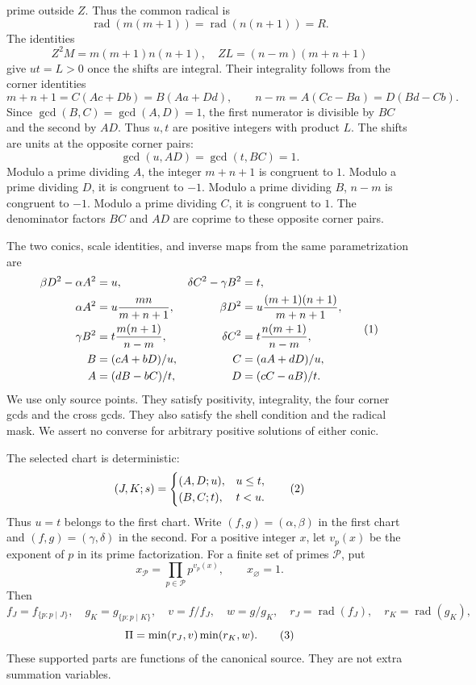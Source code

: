 prime outside \(Z\).
Thus the common radical is
\[
\operatorname{rad}(m(m+1))=\operatorname{rad}(n(n+1))=R.
\]
The identities
\[
Z^2M=m(m+1)n(n+1),\quad ZL=(n-m)(m+n+1)
\]
give \(ut=L>0\) once the shifts are integral. Their integrality follows
from the corner identities
\[
m+n+1=C(Ac+Db)=B(Aa+Dd),\qquad
n-m=A(Cc-Ba)=D(Bd-Cb).
\]
Since \(\gcd(B,C)=\gcd(A,D)=1\), the first numerator is divisible by
\(BC\) and the second by \(AD\). Thus \(u,t\) are positive integers
with product \(L\).
The shifts are units at the opposite corner pairs:
\[
\gcd(u,AD)=\gcd(t,BC)=1.
\]
Modulo a prime dividing \(A\), the integer \(m+n+1\) is
congruent to \(1\). Modulo a prime dividing \(D\), it is congruent to
\(-1\). Modulo a prime dividing \(B\), \(n-m\) is congruent to
\(-1\). Modulo a prime dividing \(C\), it is congruent to \(1\).
The denominator factors \(BC\) and \(AD\) are
coprime to these opposite corner pairs.

The two conics, scale identities, and inverse maps from the same
parametrization are
\[
\begin{aligned}
\beta D^2-\alpha A^2&=u,&
\delta C^2-\gamma B^2&=t,\\
\alpha A^2&=u\frac{mn}{m+n+1},&
\beta D^2&=u\frac{(m+1)(n+1)}{m+n+1},\\
\gamma B^2&=t\frac{m(n+1)}{n-m},&
\delta C^2&=t\frac{n(m+1)}{n-m},\\
B&=(cA+bD)/u,& C&=(aA+dD)/u,\\
A&=(dB-bC)/t,& D&=(cC-aB)/t.
\end{aligned}\AutoTag{eq:old:2_2}
\]
We use only source points. They satisfy positivity, integrality, the
four corner gcds and the cross gcds. They also satisfy the shell
condition and the radical mask. We assert no converse for arbitrary
positive solutions of either conic.

The selected chart is deterministic:
\[
(J,K;s)=
\begin{cases}(A,D;u),&u\le t,\\(B,C;t),&t<u.\end{cases}\AutoTag{eq:old:2_3}
\]
Thus \(u=t\) belongs to the first chart. Write \((f,g)=(\alpha,\beta)\)
in the first chart and \((f,g)=(\gamma,\delta)\) in the second. For a
positive integer \(x\), let \(v_p(x)\) be the exponent of \(p\) in its
prime factorization. For a finite set of primes \(\mathcal P\), put
\[
x_{\mathcal P}=\prod_{p\in\mathcal P}p^{v_p(x)},\qquad
x_{\varnothing}=1.
\]
Then
\[
f_J=f_{\{p:p\mid J\}},\quad g_K=g_{\{p:p\mid K\}},\quad
v=f/f_J,\quad w=g/g_K,\quad
r_J=\operatorname{rad}(f_J),\quad r_K=\operatorname{rad}(g_K),
\]
\[
\Pi=\min(r_J,v)\min(r_K,w).\AutoTag{eq:old:2_4}
\]
These supported parts are functions of the canonical source. They are
not extra summation variables.

